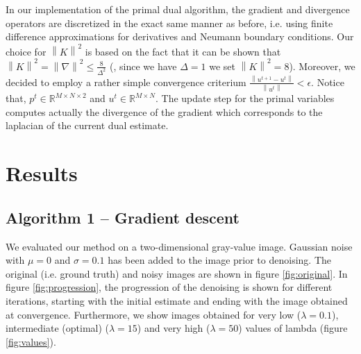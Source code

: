 \documentclass{paper}
\begin{document}
In our implementation of the primal dual algorithm, the gradient and divergence operators are discretized in the exact same manner as before, i.e. using finite difference approximations for derivatives and Neumann boundary conditions. Our choice for \begin{math}\left\|K\right\|^{2}\end{math} is based on the fact that it can be shown that \begin{math}\left\|K\right\|^{2}=\left\|\nabla\right\|^{2}\leq \frac{8}{\Delta^{2}}\end{math} (\cite{chambolle}, since we have \begin{math}\Delta=1\end{math} we set \begin{math}\left\|K\right\|^{2}=8\end{math}). Moreover, we decided to employ a rather simple convergence criterium \begin{math}\frac{\left\|u^{t+1}-u^{t}\right\|}{\left\|u^{t}\right\|}<\epsilon\end{math}. Notice that, \begin{math}p^{t}\in\mathbb{R}^{M\times N\times 2}\end{math} and \begin{math}u^{t}\in\mathbb{R}^{M\times N}\end{math}. The update step for the primal variables computes actually the divergence of the gradient which corresponds to the laplacian of the current dual estimate.

\section{Results}

\subsection{Algorithm 1 -- Gradient descent}

We evaluated our method on a two-dimensional gray-value image. Gaussian noise with \begin{math}\mu=0\end{math} and \begin{math}\sigma=0.1\end{math} has been added to the image prior to denoising. The original (i.e. ground truth) and noisy images are shown in figure \ref{fig:original}. In figure \ref{fig:progression}, the progression of the denoising is shown for different iterations, starting with the initial estimate and ending with the image obtained at convergence. Furthermore, we show images obtained for very low (\begin{math}\lambda=0.1\end{math}), intermediate (optimal) (\begin{math}\lambda=15\end{math}) and very high (\begin{math}\lambda=50\end{math}) values of lambda (figure \ref{fig:values}).
\end{document}
